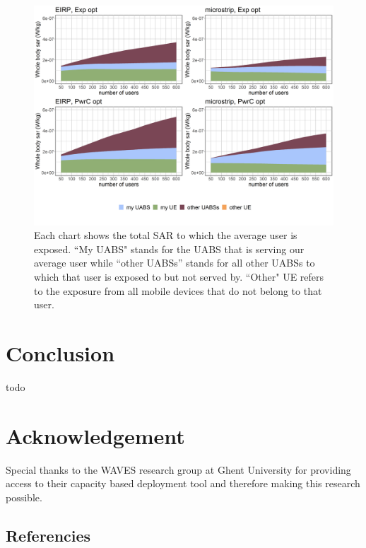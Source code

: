 \documentclass[twocolumn]{phdsymp} %
\begin{document}
\begin{figure}[h!]
  \includegraphics[width=\linewidth]{../results/s3/uFourSources.png}
  \caption{Each chart shows the total SAR to which the average user is exposed. ``My UABS" stands for the UABS that is serving our average user while ``other UABSs'' stands for 
  all other UABSs to which that user is exposed to but not served by. ``Other" UE refers to the exposure from all mobile devices that do not belong to that user.}
  \label{fig:s3b_fourSourcesMatrix}
\end{figure}






\section{Conclusion}
todo

\section{Acknowledgement}
Special thanks to the WAVES research group at Ghent University for providing 
access to their capacity based deployment tool and therefore making this research possible.

\subsection{Referencies}
\nocite{*}


\end{document}
